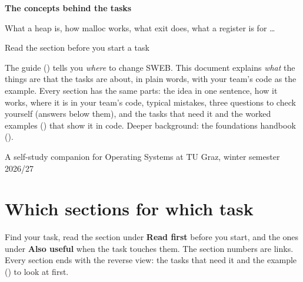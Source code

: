 \documentclass[11pt]{report}
\begin{document}
\begin{titlepage}
  \centering
  \vspace*{3cm}
  {\Huge\bfseries The concepts behind the tasks\par}
  \vspace{0.6cm}
  {\Large What a heap is, how malloc works, what exit does, what a register is for \ldots\par}
  \vspace{2cm}
  {\large Read the section before you start a task\par}
  \vfill
  \begin{infobox}
  The guide () tells you \emph{where} to change SWEB. This document explains
  \emph{what} the things are that the tasks are about, in plain words, with your team's code as the
  example. Every section has the same parts: the idea in one sentence, how it works, where it is in
  your team's code, typical mistakes, three questions to check yourself (answers below them), and
  the tasks that need it and the worked examples () that show it in code. Deeper background: the foundations handbook
  ().
  \end{infobox}
  \vspace{1cm}
  {\small A self-study companion for Operating Systems at TU Graz, winter semester 2026/27\par}
\end{titlepage}

\tableofcontents

\chapter*{Which sections for which task}

Find your task, read the section under \textbf{Read first} before you start, and the ones under
\textbf{Also useful} when the task touches them. The section numbers are links. Every section ends
with the reverse view: the tasks that need it and the example () to look at first.
\end{document}
